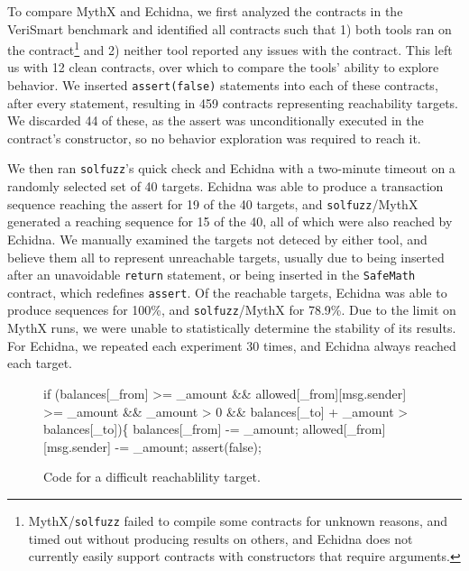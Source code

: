 To compare MythX and Echidna, we first analyzed the contracts in the VeriSmart benchmark \cite{vsbenchmark} and identified all contracts such that 1) both tools ran on the contract\footnote{MythX/{\tt solfuzz} failed to compile some contracts for unknown reasons, and timed out without producing results on others, and Echidna does not currently easily support contracts with constructors that require arguments.} and 2) neither tool reported any issues with the contract.  This left us with 12 clean contracts, over which to compare the tools' ability to explore behavior.  We inserted {\tt assert(false)} statements into each of these contracts, after every statement, resulting in 459 contracts representing reachability targets.  We discarded 44 of these, as the assert was unconditionally executed in the contract's constructor, so no behavior exploration was required to reach it.

We then ran {\tt solfuzz}'s quick check and Echidna with a two-minute timeout on a randomly selected set of 40 targets.  Echidna was able to produce a transaction sequence reaching the assert for 19 of the 40 targets, and {\tt solfuzz}/MythX generated a reaching sequence for 15 of the 40, all of which were also reached by Echidna. We manually examined the targets not deteced by either tool, and believe them all to represent unreachable targets, usually due to being inserted after an unavoidable {\tt return} statement, or being inserted in the {\tt SafeMath} contract, which redefines {\tt assert}.  Of the reachable targets, Echidna was able to produce sequences for 100\%, and {\tt solfuzz}/MythX for 78.9\%.  Due to the limit on MythX runs, we were unable to statistically determine the stability of its results.  For Echidna, we repeated each experiment 30 times, and Echidna always reached each target.

\begin{figure}
  \begin{code}
if (balances[\_from] >= \_amount
  \&\& allowed[\_from][msg.sender] >= \_amount
  \&\& \_amount > 0
  \&\& balances[\_to] + \_amount > balances[\_to])\{
    balances[\_from] -= \_amount;
    allowed[\_from][msg.sender] -= \_amount;
\vspace{0.1in}
    assert(false);
  \end{code}
  \caption{Code for a difficult reachablility target.}
  \label{fig:code}
  \end{figure}

